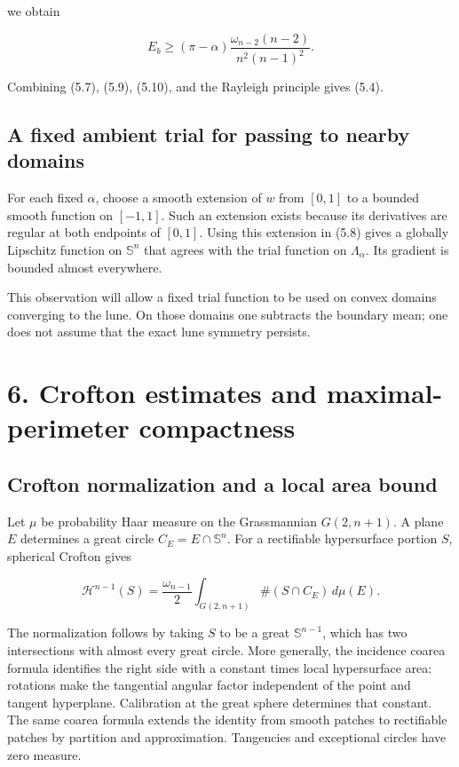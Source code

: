 \documentclass[11pt]{article}
\begin{document}
we obtain

\[
E_b\geq
(\pi-\alpha)\frac{\omega_{n-2}(n-2)}{n^2(n-1)^2}.
\tag{5.15}
\]

Combining (5.7), (5.9), (5.10), and the Rayleigh principle gives (5.4).

\subsection{A fixed ambient trial for passing to nearby
domains}\label{a-fixed-ambient-trial-for-passing-to-nearby-domains}

For each fixed \(\alpha\), choose a smooth extension of \(w\) from
\([0,1]\) to a bounded smooth function on \([-1,1]\). Such an extension
exists because its derivatives are regular at both endpoints of
\([0,1]\). Using this extension in (5.8) gives a globally Lipschitz
function on \(\mathbb S^n\) that agrees with the trial function on
\(\Lambda_\alpha\). Its gradient is bounded almost everywhere.

This observation will allow a fixed trial function to be used on convex
domains converging to the lune. On those domains one subtracts the
boundary mean; one does not assume that the exact lune symmetry
persists.

\section{6. Crofton estimates and maximal-perimeter
compactness}\label{crofton-estimates-and-maximal-perimeter-compactness}

\subsection{Crofton normalization and a local area
bound}\label{crofton-normalization-and-a-local-area-bound}

Let \(\mu\) be probability Haar measure on the Grassmannian
\(G(2,n+1)\). A plane \(E\) determines a great circle
\(C_E=E\cap\mathbb S^n\). For a rectifiable hypersurface portion \(S\),
spherical Crofton gives

\[
\mathcal H^{n-1}(S)
=\frac{\omega_{n-1}}2\int_{G(2,n+1)}
\#(S\cap C_E)\,d\mu(E).
\tag{6.1}
\]

The normalization follows by taking \(S\) to be a great
\(\mathbb S^{n-1}\), which has two intersections with almost every great
circle. More generally, the incidence coarea formula identifies the
right side with a constant times local hypersurface area: rotations make
the tangential angular factor independent of the point and tangent
hyperplane. Calibration at the great sphere determines that constant.
The same coarea formula extends the identity from smooth patches to
rectifiable patches by partition and approximation. Tangencies and
exceptional circles have zero measure.
\end{document}
